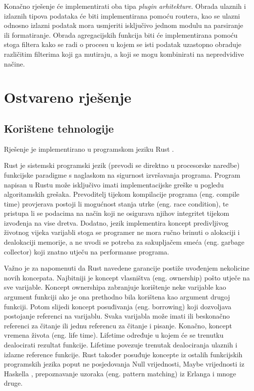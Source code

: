 \documentclass[times, utf8, zavrsni]{fer}
\begin{document}
Konačno rješenje će implementirati
oba tipa \textit{plugin arhitekture}. Obrada ulaznih i izlaznih tipova podataka
će biti
implementirana pomoću routera, kao se ulazni odnosno izlazni podatak mora
usmjeriti isključivo jednom modulu na parsiranje ili formatiranje. Obrada
agregacijskih funkcija biti će implementirana pomoću stoga filtera kako se
radi o procesu u kojem se isti podatak uzastopno obraduje različitim filterima
koji ga mutiraju, a koji se mogu kombinirati na nepredvidive načine.

\chapter{Ostvareno rješenje}

\section{Korištene tehnologije}

Rješenje je implementirano u programskom jeziku Rust \cite{rust_lang_page}.

Rust je sistemski programski jezik (prevodi se direktno u procesorske
naredbe) funkcijske paradigme s naglaskom na sigurnost izvršavanja programa.
Program napisan u Rustu može isključivo imati implementacijske greške u pogledu
algoritamskih grešaka. Prevoditelj tijekom kompilacije programa (eng. compile
time) provjerava postoji li mogućnost stanja utrke (eng. race condition), te
pristupa li se podacima na način koji ne osigurava njihov integritet tijekom
izvođenja na vise dretva. Dodatno, jezik implementira koncept predivljivog
životnog vijeka varijabli stoga se programer ne mora ručno brinuti o alokaciji
i dealokaciji memorije, a ne uvodi se potreba za sakupljačem smeća (eng.
garbage collector) koji znatno utječu na performanse programa.

Važno je za napomenuti da Rust navedene garancije postiže uvođenjem nekolicine
novih koncepata. Najbitniji je koncept vlasništva (eng. ownership) pošto utječe
na sve varijable. Koncept ownershipa zabranjuje korištenje neke varijable kao
argument funkciji ako je ona prethodno bila korištena kao argument drugoj
funkciji. Potom slijedi koncept posuđivanja (eng. borrowing) koji dozvoljava
postojanje referenci na varijablu. Svaka varijabla može imati ili beskonačno
referenci za čitanje ili jednu referencu za čitanje i pisanje. Konačno, koncept
vremena života (eng. life time). Lifetime određuje u kojem će se trenutku
dealocirati rezultat funkcije. Lifetime povezuje trenutak dealociranja ulaznih i
izlazne reference funkcije. Rust također posuđuje koncepte iz ostalih
funkcijskih programskih jezika poput ne posjedovanja Null vrijednosti, Maybe
vrijednosti iz Haskella \cite{haskell_lang_page}, prepoznavanje uzoraka
(eng. pattern matching) iz Erlanga \cite{erlang_lang_page} i mnoge druge.
\end{document}
